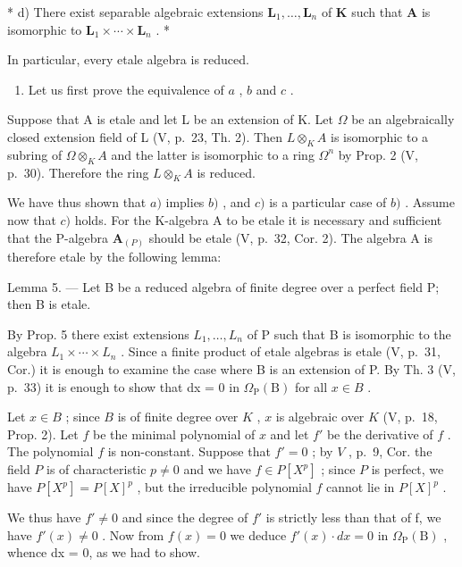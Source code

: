 * d) There exist separable algebraic extensions \(\mathbf{L}_1, \ldots, \mathbf{L}_n\) of \(\mathbf{K}\) such that \(\mathbf{A}\) is isomorphic to \(\mathbf{L}_1 \times \cdots \times \mathbf{L}_n\) . *

In particular, every etale algebra is reduced.

\begin{enumerate}
\def\labelenumi{\Alph{enumi})}
\tightlist
\item
  Let us first prove the equivalence of \(a\) , \(b\) and \(c\) .
\end{enumerate}

Suppose that A is etale and let L be an extension of K. Let \(\Omega\) be an algebraically closed extension field of L (V, p.~23, Th. 2). Then \(L \otimes_{K} A\) is isomorphic to a subring of \(\Omega \otimes_{K} A\) and the latter is isomorphic to a ring \(\Omega^{n}\) by Prop. 2 (V, p.~30). Therefore the ring \(L \otimes_{K} A\) is reduced.

We have thus shown that \(a)\) implies \(b)\) , and \(c)\) is a particular case of \(b)\) . Assume now that \(c)\) holds. For the K-algebra A to be etale it is necessary and sufficient that the P-algebra \(\mathbf{A}_{(P)}\) should be etale (V, p.~32, Cor. 2). The algebra A is therefore etale by the following lemma:

Lemma 5. --- Let B be a reduced algebra of finite degree over a perfect field P; then B is etale.

By Prop. 5 there exist extensions \(L_{1}, \ldots, L_{n}\) of P such that B is isomorphic to the algebra \(L_{1} \times \cdots \times L_{n}\) . Since a finite product of etale algebras is etale (V, p.~31, Cor.) it is enough to examine the case where B is an extension of P. By Th. 3 (V, p.~33) it is enough to show that dx = 0 in \(\Omega_{\mathrm{P}}(\mathrm{B})\) for all \(x \in B\) .

Let \(x \in B\) ; since \(B\) is of finite degree over \(K\) , \(x\) is algebraic over \(K\) (V, p.~18, Prop. 2). Let \(f\) be the minimal polynomial of \(x\) and let \(f'\) be the derivative of \(f\) . The polynomial \(f\) is non-constant. Suppose that \(f' = 0\) ; by \(V\) , p.~9, Cor. the field \(P\) is of characteristic \(p \neq 0\) and we have \(f \in P[X^p]\) ; since \(P\) is perfect, we have \(P[X^p] = P[X]^p\) , but the irreducible polynomial \(f\) cannot lie in \(P[X]^p\) .

We thus have \(f' \neq 0\) and since the degree of \(f'\) is strictly less than that of f, we have \(f'(x) \neq 0\) . Now from \(f(x) = 0\) we deduce \(f'(x) \cdot dx = 0\) in \(\Omega_{\mathrm{P}}(\mathrm{B})\) , whence dx = 0, as we had to show.

